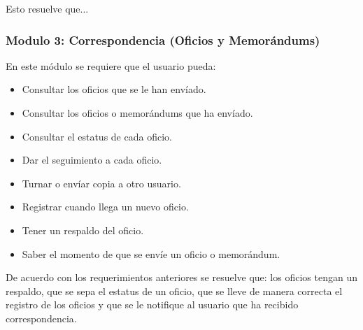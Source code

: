 Esto resuelve que...


\subsubsection{Modulo 3: Correspondencia (Oficios y Memorándums)}
En este módulo se requiere que el usuario pueda: 

\begin{itemize}
	\item Consultar los oficios que se le han envíado.
	\item Consultar los oficios o memorándums que ha envíado.
	\item Consultar el estatus de cada oficio.
	\item Dar el seguimiento a cada oficio.
	\item Turnar o envíar copia a otro usuario.
	\item Registrar cuando llega un nuevo oficio.
	\item Tener un respaldo del oficio.
	\item Saber el momento de que se envíe un oficio o memorándum.
\end{itemize}

De acuerdo con los requerimientos anteriores se resuelve que: los oficios tengan un respaldo, que se sepa el estatus de un oficio, que se lleve de manera correcta el registro de los oficios y que se le notifique al usuario que ha recibido correspondencia.\\

